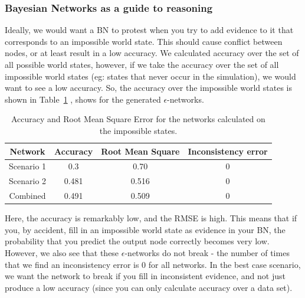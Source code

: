  \subsubsection{Bayesian Networks as a guide to reasoning}
 Ideally, we would want a BN to protest when you try to add evidence to it that corresponds to an impossible world state. This should cause conflict between nodes, or at least result in a low accuracy. We calculated accuracy over the set of all possible world states, however, if we take the accuracy over the set of all impossible world states (eg: states that never occur in the simulation), we would want to see a low accuracy. So, the accuracy over the impossible world states is shown in Table~\ref{tabVlekNetworkimpossible} , shows for the generated $\epsilon$-networks.
 \begin{table}[htp]
\begin{center}
\begin{tabular}{|c|c|c|c|}
 \hline
 Network & Accuracy & Root Mean Square & Inconsistency error\\
 \hline
 Scenario 1   & 0.3 &  0.70 & 0   \\
 Scenario 2 & 0.481 & 0.516 & 0\\
 Combined & 0.491 & 0.509& 0\\
\hline
\end{tabular}
\caption{Accuracy and Root Mean Square Error for the networks calculated on the impossible states.}
\label{tabVlekNetworkimpossible}
\end{center}
\end{table}

Here, the accuracy is remarkably low, and the RMSE is high. This means that if you, by accident, fill in an impossible world state as evidence in your BN, the probability that you predict the output node correctly becomes very low. However, we also see that these $\epsilon$-networks do not break - the number of times that we find an inconsistency error is 0 for all networks. In the best case scenario, we want the network to break if you fill in inconsistent evidence, and not just produce a low accuracy (since you can only calculate accuracy over a data set). 


